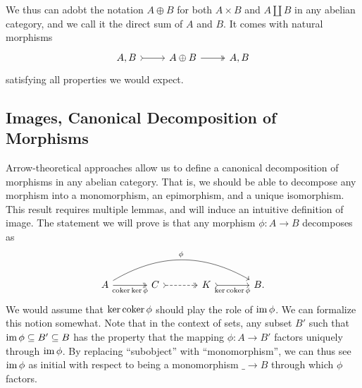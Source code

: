 We thus can adobt the notation $A\oplus B$ for both $A\times B$ and $A\amalg B$ in any abelian category, and we call it the direct sum of $A$ and $B$. It comes with natural morphisms
\[\begin{tikzcd}[row sep = 2.5em, column sep = 2.5em]
	A,B\arrow[r, tail]&A\oplus B\arrow[r, two heads]&A,B
\end{tikzcd}\]
satisfying all properties we would expect.

\subsection{Images, Canonical Decomposition of Morphisms}

Arrow-theoretical approaches allow us to define a canonical decomposition of morphisms in any abelian category. That is, we should be able to decompose any morphism into a monomorphism, an epimorphism, and a unique isomorphism. This result requires multiple lemmas, and will induce an intuitive definition of image. The statement we will prove is that any morphism $\phi : A \to B$ decomposes as
\[\begin{tikzcd}[row sep = 2.5em, column sep = 3.5em]
		A\arrow[rrr, bend left, "\phi "]\arrow[r, two heads, "\coker \ker \phi "']&C\arrow[r, dashed, tail, two heads]&K\arrow[r, tail, "\ker \coker \phi "']&B.
\end{tikzcd}\]
We would assume that $\ker \operatorname{coker} \phi $ should play the role of $\operatorname{im} \phi $. We can formalize this notion somewhat. Note that in the context of sets, any subset $B'$ such that $\operatorname{im} \phi \subseteq B'\subseteq B$ has the property that the mapping $\phi : A \to B'$ factors uniquely through $\operatorname{im} \phi $. By replacing ``subobject'' with ``monomorphism'', we can thus see $\operatorname{im} \phi $ as initial with respect to being a monomorphism $\_\to B$ through which $\phi $ factors.

